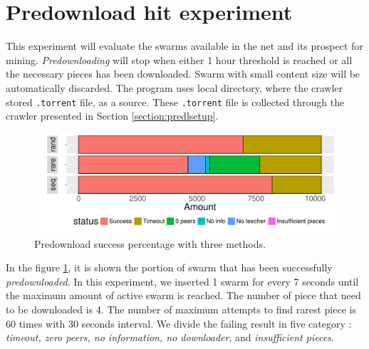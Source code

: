 \section{Predownload hit experiment}
This experiment will evaluate the swarms available in the net and its prospect for mining. \textit{Predownloading} will stop when either 1 hour threshold is reached or all the necessary pieces has been downloaded. Swarm with small content size will be automatically discarded. The program uses local directory, where the crawler stored \texttt{.torrent} file, as a source. These \texttt{.torrent} file is collected through the crawler presented in Section \ref{section:predlsetup}.


\begin{figure}[h]
	\centering
	\includegraphics[width=\textwidth]{pics/results/dpredown_merge.pdf}
	\caption{Predownload success percentage with three methods.}
	\label{fig:predownprecent}
\end{figure}

In the figure \ref{fig:predownprecent}, it is shown the portion of swarm that has been successfully \textit{predownloaded}. In this experiment, we inserted 1 swarm for every 7 seconds until the maximum amount of active swarm is reached. The number of piece that need to be downloaded is 4. The number of maximum attempts to find rarest piece is 60 times with 30 seconds interval. We divide the failing result in five category : \textit{timeout, zero peers, no information, no downloader}, and \textit{insufficient pieces}.

